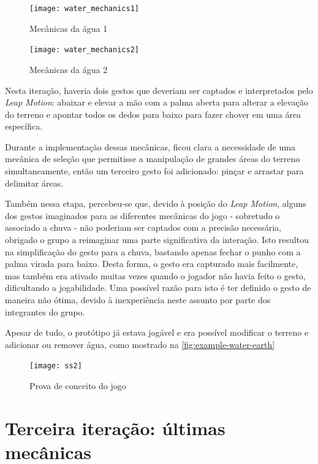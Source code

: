 \begin{figure}[ht]
	\centering
	\caption{Mecânicas da água 1}
	\texttt{[image: water\_mechanics1]}
	\legend{\fonteAP}
	\label{fig:mecanica-agua-enchendo-graficamente}
\end{figure}

\begin{figure}[ht]
	\centering
	\caption{Mecânicas da água 2}
	\texttt{[image: water\_mechanics2]}
	\legend{\fonteAP}
	\label{fig:mecanica-agua-enchendo-mecanica}
\end{figure}

Nesta iteração, haveria dois gestos que deveriam ser captados e interpretados 
pelo \textit{Leap Motion}: abaixar e elevar a mão com a palma aberta para alterar 
a elevação do terreno e apontar todos os dedos para baixo para fazer chover em 
uma área específica.

Durante a implementação dessas mecânicas, ficou clara a necessidade de uma 
mecânica de seleção que permitisse a manipulação de grandes áreas do terreno
simultaneamente, então um terceiro gesto foi adicionado: pinçar e arrastar 
para delimitar áreas.

Também nessa etapa, percebeu-se que, devido à posição do \textit{Leap Motion},
alguns dos gestos imaginados para as diferentes mecânicas do jogo - sobretudo 
o associado a chuva - não poderiam ser captados com a precisão necessária, 
obrigado o grupo a reimaginar uma parte significativa da interação. Isto 
resultou na simplificação do gesto para a chuva, bastando apenas fechar o punho
com a palma virada para baixo. Desta forma, o gesto era capturado mais facilmente,
mas também era ativado muitas vezes quando o jogador não havia feito o gesto, 
dificultando a jogabilidade. Uma possível razão para isto é ter definido o 
gesto de maneira não ótima, devido à inexperiência neste assunto por parte
dos integrantes do grupo.

Apesar de tudo, o protótipo já estava jogável e era possível modificar 
o terreno e adicionar ou remover água, como mostrado 
na \autoref{fig:example-water-earth}

\begin{figure}[ht]
	\centering
	\caption{Prova de conceito do jogo}
	\texttt{[image: ss2]}
	\legend{\fonteAP}
	\label{fig:example-water-earth}
\end{figure}

\section{Terceira iteração: últimas mecânicas}\label{sec-terceira-iteracao-ultimas-mecanicas}

